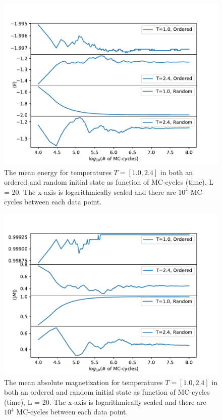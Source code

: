 \documentclass[12pt,english,a4paper]{article}
\begin{document}
\begin{figure}[H]
    \centering
    \includegraphics[scale=0.7]{Figures/Most_Likely_State_E_mean_L_20.pdf}
    \caption{The mean energy for temperatures $T=[1.0,2.4]$ in both an ordered and random initial state as function of MC-cycles (time), L = 20. The x-axis is logarithmically scaled and there are $10^4$ MC-cycles between each data point.}
    \label{fig:E_equiv}
\end{figure}
\begin{figure}[H]
    \centering
    \includegraphics[scale=0.7]{Figures/Most_Likely_State_M_abs_L_20.pdf}
    \caption{The mean absolute magnetization for temperatures $T=[1.0,2.4]$ in both an ordered and random initial state as function of MC-cycles (time), L = 20. The x-axis is logarithmically scaled and there are $10^4$ MC-cycles between each data point.}
    \label{fig:M_equiv}
\end{figure}
\end{document}
